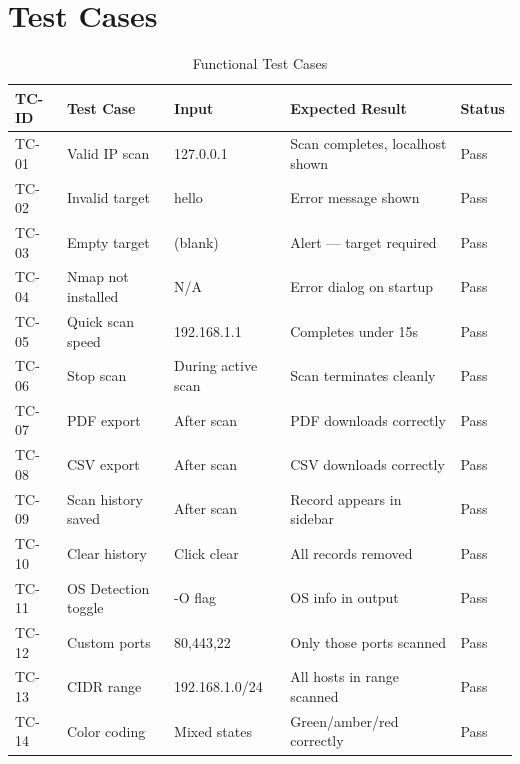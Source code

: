 \documentclass[12pt, a4paper]{report}
\begin{document}
\section{Test Cases}
\begin{table}[H]
  \centering
  \caption{Functional Test Cases}
  \label{tab:testcases}
  \begin{tabularx}{\textwidth}{@{}l X X X l@{}}
    \toprule
    \textbf{TC-ID} & \textbf{Test Case} & \textbf{Input} & \textbf{Expected Result} & \textbf{Status} \\
    \midrule
    TC-01 & Valid IP scan & 127.0.0.1 & Scan completes, localhost shown & Pass \\
    TC-02 & Invalid target & hello & Error message shown & Pass \\
    TC-03 & Empty target & (blank) & Alert --- target required & Pass \\
    TC-04 & Nmap not installed & N/A & Error dialog on startup & Pass \\
    TC-05 & Quick scan speed & 192.168.1.1 & Completes under 15s & Pass \\
    TC-06 & Stop scan & During active scan & Scan terminates cleanly & Pass \\
    TC-07 & PDF export & After scan & PDF downloads correctly & Pass \\
    TC-08 & CSV export & After scan & CSV downloads correctly & Pass \\
    TC-09 & Scan history saved & After scan & Record appears in sidebar & Pass \\
    TC-10 & Clear history & Click clear & All records removed & Pass \\
    TC-11 & OS Detection toggle & -O flag & OS info in output & Pass \\
    TC-12 & Custom ports & 80,443,22 & Only those ports scanned & Pass \\
    TC-13 & CIDR range & 192.168.1.0/24 & All hosts in range scanned & Pass \\
    TC-14 & Color coding & Mixed states & Green/amber/red correctly & Pass \\
    \bottomrule
  \end{tabularx}
\end{table}
\end{document}
